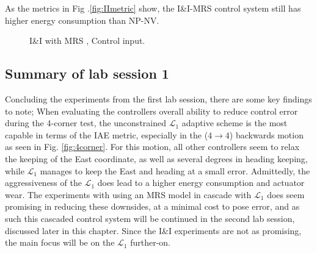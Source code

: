 As the metrics in Fig .\ref{fig:IImetric} show, the I\&I-MRS control system still has higher energy consumption than NP-NV.

\begin{figure}[!h]
    \centering
    \caption{I\&I with MRS , Control input.}
\end{figure}\label{fig:IIMRStau}

\subsection{Summary of lab session 1}

 Concluding the experiments from the first lab session, there are some key findings to note; When evaluating the controllers overall ability to reduce control error during the 4-corner test, the unconstrained $\mathcal{L}_1$ adaptive scheme is the most capable in terms of the IAE metric, especially in the ($4 \xrightarrow{} 4$) backwards motion as seen in Fig. \ref{fig:4corner}. For this motion, all other controllers seem to relax the keeping of the East coordinate, as well as several degrees in heading keeping, while $\mathcal{L}_1$ manages to keep the East and heading at a small error. Admittedly, the aggressiveness of the $\mathcal{L}_1$ does lead to a higher energy consumption and actuator wear. The experiments with using an MRS model in cascade with $\mathcal{L}_1$ does seem promising in reducing these downsides, at a minimal cost to pose error, and as such this cascaded control system will be continued in the second lab session, discussed later in this chapter. Since the I\&I experiments are not as promising, the main focus will be on the $\mathcal{L}_1$ further-on. 

